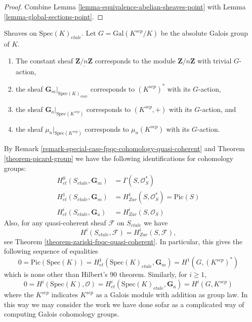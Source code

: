 \begin{proof}
Combine
Lemma \ref{lemma-equivalence-abelian-sheaves-point}
with
Lemma \ref{lemma-global-sections-point}.
\end{proof}

\begin{example}
\label{example-sheaves-point}
Sheaves on $\text{Spec}(K)_{etale}$.
Let $G = \text{Gal}(K^{sep}/K)$ be the absolute Galois group of $K$.
\begin{enumerate}
\item The constant sheaf $\underline{\mathbf{Z}/n\mathbf{Z}}$ corresponds to
the module $\mathbf{Z}/n\mathbf{Z}$ with trivial $G$-action,
\item the sheaf $\mathbf{G}_m|_{\text{Spec}(K)_{etale}}$ corresponds to
$(K^{sep})^*$ with its $G$-action,
\item the sheaf $\mathbf{G}_a|_{\text{Spec}(K^{sep})}$ corresponds to
$(K^{sep}, +)$ with its $G$-action, and
\item the sheaf $\mu_n|_{\text{Spec}(K^{sep})}$ corresponds to
$\mu_n(K^{sep})$ with its $G$-action.
\end{enumerate}
By
Remark \ref{remark-special-case-fpqc-cohomology-quasi-coherent}
and
Theorem \ref{theorem-picard-group}
we have the following identifications for cohomology groups:
\begin{align*}
H_{et}^0(S_{etale}, \mathbf{G}_m) & = \Gamma(S, \mathcal{O}_S^*) \\
H_{et}^1(S_{etale}, \mathbf{G}_m) & =
H_{Zar}^1(S, \mathcal{O}_S^*) = \text{Pic}(S) \\
H_{et}^i(S_{etale}, \mathbf{G}_a) & = H_{Zar}^i(S, \mathcal{O}_S)
\end{align*}
Also, for any quasi-coherent sheaf $\mathcal{F}$ on $S_{etale}$ we have
$$
H^i(S_{etale}, \mathcal{F}) = H_{Zar}^i(S, \mathcal{F}),
$$
see
Theorem \ref{theorem-zariski-fpqc-quasi-coherent}.
In particular, this gives the following sequence of equalities
$$
0 =
\text{Pic}(\text{Spec}(K)) =
H_{et}^1(\text{Spec}(K)_{etale}, \mathbf{G}_m) =
H^1(G, (K^{sep})^*)
$$
which is none other than Hilbert's 90 theorem. Similarly, for $i \geq 1$,
$$
0 = H^i(\text{Spec}(K), \mathcal{O})
= H_{et}^i(\text{Spec}(K)_{etale}, \mathbf{G}_a)
= H^i(G, K^{sep})
$$
where the $K^{sep}$ indicates $K^{sep}$ as a Galois module with addition
as group law. In this way we may consider the work we have done sofar as
a complicated way of computing Galois cohomology groups.
\end{example}











